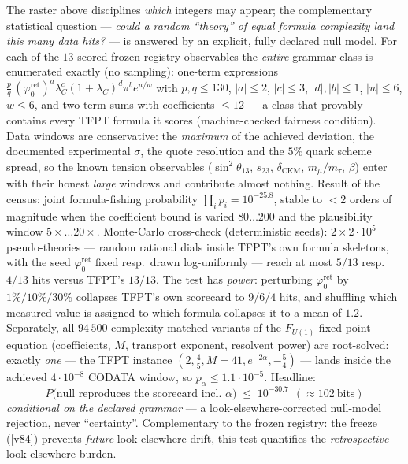\documentclass[11pt,a4paper]{article}
\newcommand{\phiz}{\varphi_0^{\mathrm{ret}}}
\newcommand{\lamC}{\lambda_C}
\theoremstyle{definition}
\begin{document}
\begin{winbox}
The raster above disciplines \emph{which} integers may appear; the complementary statistical question ---
\emph{could a random ``theory'' of equal formula complexity land this many data hits?} --- is answered by an
explicit, fully declared null model. For each of the $13$ scored frozen-registry observables the
\emph{entire} grammar class is enumerated exactly (no sampling): one-term expressions
$\tfrac pq\,(\phiz)^a\lamC^c(1{+}\lamC)^d\pi^b e^{u/w}$ with $p,q\le130$, $|a|\le2$, $|c|\le3$,
$|d|,|b|\le1$, $|u|\le6$, $w\le6$, and two-term sums with coefficients $\le12$ --- a class that provably
contains every TFPT formula it scores (machine-checked fairness condition). Data windows are conservative:
the \emph{maximum} of the achieved deviation, the documented experimental $\sigma$, the quote resolution and
the $5\%$ quark scheme spread, so the known tension observables ($\sin^2\theta_{13}$, $s_{23}$,
$\delta_{\mathrm{CKM}}$, $m_\mu/m_\tau$, $\beta$) enter with their honest \emph{large} windows and contribute
almost nothing. Result of the census: joint formula-fishing probability
$\prod_i p_i=10^{-25.8}$, stable to $<2$ orders of magnitude when the coefficient bound is varied
$80\dots200$ and the plausibility window $5{\times}\dots20{\times}$. Monte-Carlo cross-check
(deterministic seeds): $2\times2{\cdot}10^5$ pseudo-theories --- random rational dials inside TFPT's own
formula skeletons, with the seed $\phiz$ fixed resp.\ drawn log-uniformly --- reach at most $5/13$
resp.\ $4/13$ hits versus TFPT's $13/13$. The test has \emph{power}: perturbing $\phiz$ by
$1\%/10\%/30\%$ collapses TFPT's own scorecard to $9/6/4$ hits, and shuffling which measured value is
assigned to which formula collapses it to a mean of $1.2$. Separately, all $94\,500$ complexity-matched
variants of the $F_{U(1)}$ fixed-point equation (coefficients, $M$, transport exponent, resolvent power)
are root-solved: exactly \emph{one} --- the TFPT instance $(2,\tfrac45,M{=}41,e^{-2\alpha},-\tfrac54)$ ---
lands inside the achieved $4{\cdot}10^{-8}$ CODATA window, so $p_\alpha\le1.1{\cdot}10^{-5}$. Headline:
\[
  \boxed{\ P\bigl(\text{null reproduces the scorecard incl.\ }\alpha\bigr)
  \;\le\;10^{-30.7}\ \ (\approx102\ \text{bits})\ }
\]
\emph{conditional on the declared grammar} --- a look-elsewhere-corrected null-model rejection, never
``certainty''. Complementary to the frozen registry: the freeze (\vref{v84}) prevents \emph{future}
look-elsewhere drift, this test quantifies the \emph{retrospective} look-elsewhere burden.
\end{winbox}
\end{document}
